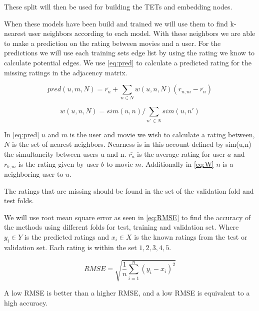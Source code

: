 These split will then be used for building the TETs and embedding nodes.

When these models have been build and trained we will use them to find k-nearest user neighbors according to each model.
With these neighbors we are able to make a prediction on the rating between movies and a user.
For the predictions we will use each training sets edge list by using the rating we know to calculate potential edges. 
We use \autoref{eq:pred} to calculate a predicted rating for the missing ratings in the adjacency matrix.

\begin{equation}\label{eq:pred}
pred(u,m,N) = \overline{r_u}+\sum_{n \in N}w(u,n, N)(r_{n,m}-\overline{r_n})
\end{equation}

\begin{equation}\label{eq:W}
w(u,n, N)=sim(u,n)/\sum_{n' \in N} sim(u,n')
\end{equation}

In \autoref{eq:pred} $u$ and $m$ is the user and movie we wish to calculate a rating between, $N$ is the set of nearest neighbors.
Nearness is in this account defined by sim(u,n) the simultaneity between users u and n.
$\overline{r_a}$ is the average rating for user $a$ and $r_{b,m}$ is the rating given by user $b$ to movie $m$.
Additionally in \autoref{eq:W} $n$ is a neighboring user to $u$.

The ratings that are missing should be found in the set of the validation fold and test folds.

We will use root mean square error as seen in  \autoref{eq:RMSE}\cite{chai2014root} to find the accuracy of the methods using different folds for test, training and validation set.
Where $y_i \in Y$ is the predicted ratings and $x_i \in X$ is the known ratings from the test or validation set. Each rating is within the set ${1,2,3,4,5}$.

\begin{equation}\label{eq:RMSE}
RMSE = \sqrt{\frac{1}{n}\sum^n_{i=1}(y_i - x_i)^2}
\end{equation}

A low RMSE is better than a higher RMSE, and a low RMSE is equivalent to a high accuracy.

